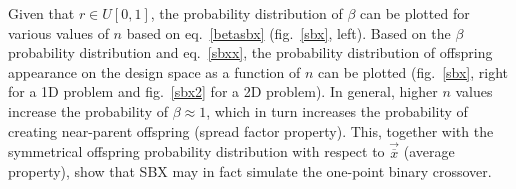 \begin{itemize}
Given that $r  \! \in  \! U[0,1]$, the probability distribution of $\beta$  can be plotted for various values of $n$ based on eq.\ \ref{betasbx} (fig.\ \ref{sbx}, left). Based on the $\beta$ probability distribution and eq.\ \ref{sbxx}, the probability distribution of offspring appearance on the design space as a function of $n$ can be plotted (fig.\ \ref{sbx}, right for a 1D problem and fig.\ \ref{sbx2} for a 2D problem). In general, higher $n$ values increase the probability of $\beta \approx 1$, which in turn increases the probability of creating near-parent offspring (spread factor property). This, together with the symmetrical offspring probability distribution with respect to $\vec{\overline{x}}$ (average property), show that SBX may in fact simulate the one-point binary crossover.    

\begin{figure}[h!]
\begin{minipage}[b]{0.5\linewidth}
 \centering
\end{minipage}
\begin{minipage}[b]{0.5\linewidth}
 \centering

\end{minipage}
\end{figure}
\end{itemize}
